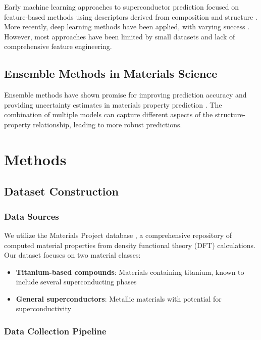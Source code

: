 \documentclass[11pt,a4paper]{article}
\begin{document}
Early machine learning approaches to superconductor prediction focused on feature-based methods using descriptors derived from composition and structure \citep{stanev2018machine}. More recently, deep learning methods have been applied, with varying success \citep{hamidieh2018data}. However, most approaches have been limited by small datasets and lack of comprehensive feature engineering.

\subsection{Ensemble Methods in Materials Science}

Ensemble methods have shown promise for improving prediction accuracy and providing uncertainty estimates in materials property prediction \citep{ward2016general}. The combination of multiple models can capture different aspects of the structure-property relationship, leading to more robust predictions.

\section{Methods}

\subsection{Dataset Construction}

\subsubsection{Data Sources}

We utilize the Materials Project database \citep{jain2013commentary}, a comprehensive repository of computed material properties from density functional theory (DFT) calculations. Our dataset focuses on two material classes:

\begin{itemize}
    \item \textbf{Titanium-based compounds}: Materials containing titanium, known to include several superconducting phases
    \item \textbf{General superconductors}: Metallic materials with potential for superconductivity
\end{itemize}

\subsubsection{Data Collection Pipeline}
\end{document}
